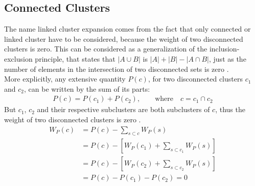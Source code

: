 \documentclass{article}
\begin{document}
\subsection{Connected Clusters}
The name linked cluster expansion comes from the fact that only
connected or linked cluster have to be considered, because the weight of two disconnected clusters is zero. This can be considered as a generalization of the
inclusion-exclusion principle, that states that $|A \cup B|$ is $|A|
+ |B| - |A \cap B|$, just as the number of elements in
the intersection of two disconnected sets is zero \cite{Melko}.\\
More explicitly, any extensive quantity $P(c)$, for two disconnected
clusters $c_1$ and $c_2$, can be written by the sum of its parts:
\begin{align}
\label{eq:7}
P(c) = P(c_1) + P(c_2), \qquad \text{where} \quad c = c_1 \cap c_2
\end{align}
But $c_1$, $c_2$ and their respective subclusters are both
subclusters of $c$, thus the weight of two disconnected clusters is zero
\cite{Rigol}.
\begin{align}
\label{eq:8}
W_P(c) &= P(c) - \sum\limits_{s \subset c} W_P(s)\\
&= P(c) - \left[ W_P(c_1) + \sum\limits_{s \subset c_1} W_P(s)
  \right]\\
&= P(c) - \left[ W_P(c_2) + \sum\limits_{s \subset c_2} W_P(s)
  \right]\\
&= P(c) - P(c_1) -P(c_2) = 0
\end{align}
\end{document}
